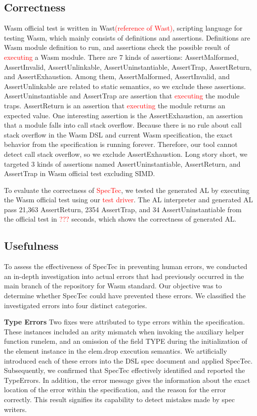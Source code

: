 \subsection{Correctness}
Wasm official test is written in Wast\textcolor{red}{(reference of Wast)}, scripting language for testing Wasm, which mainly consists of definitions and assertions.
Definitions are Wasm module definition to run, and assertions check the possible result of \textcolor{red}{executing} a Wasm module.
There are 7 kinds of assertions: AssertMalformed, AssertInvalid, AssertUnlinkable, AssertUninstantiable, AssertTrap, AssertReturn, and AssertExhaustion.
Among them, AssertMalformed, AssertInvalid, and AssertUnlinkable are related to static semantics, so we exclude these assertions.
AssertUninstantiable and AssertTrap are assertion that \textcolor{red}{executing} the module traps.
AssertReturn is an assertion that \textcolor{red}{executing} the module returns an expected value.
One interesting assertion is the AssertExhaustion, an assertion that a module falls into call stack overflow.
Because there is no rule about call stack overflow in the Wasm DSL and current Wasm specification, the exact behavior from the specification is running forever.
Therefore, our tool cannot detect call stack overflow, so we exclude AssertExhaustion.
Long story short, we targeted 3 kinds of assertions named AssertUninstantiable, AssertReturn, and AssertTrap in Wasm official test excluding SIMD.

To evaluate the correctness of \textcolor{red}{SpecTec}, we tested the generated AL by executing the Wasm official test using our \textcolor{red}{test driver}.
The AL interpreter and generated AL pass 21,363 AssertReturn, 2354 AssertTrap, and 34 AssertUninstantiable from the official test in \textcolor{red}{???} seconds, which shows the correctness of generated AL.

\subsection{Usefulness}
To assess the effectiveness of SpecTec in preventing human errors, we conducted
an in-depth investigation into actual errors that had previously occurred in
the main branch of the repository for Wasm standard. Our objective was to
determine whether SpecTec could have prevented these errors. We classified the
investigated errors into four distinct categories.

\textbf{Type Errors}
Two fixes were attributed to type errors within the specification. These
instances included an arity mismatch when invoking the auxiliary helper
function runelem, and an omission of the field TYPE during the initialization
of the element instance in the elem.drop execution semantics. We artificially
introduced each of these errors into the DSL spec document and applied SpecTec.
Subsequently, we confirmed that SpecTec effectively identified and reported the
TypeErrors. In addition, the error message gives the information about the
exact location of the error within the specification, and the reason for the
error correctly.  This result signifies its capability to detect mistakes made
by spec writers.

